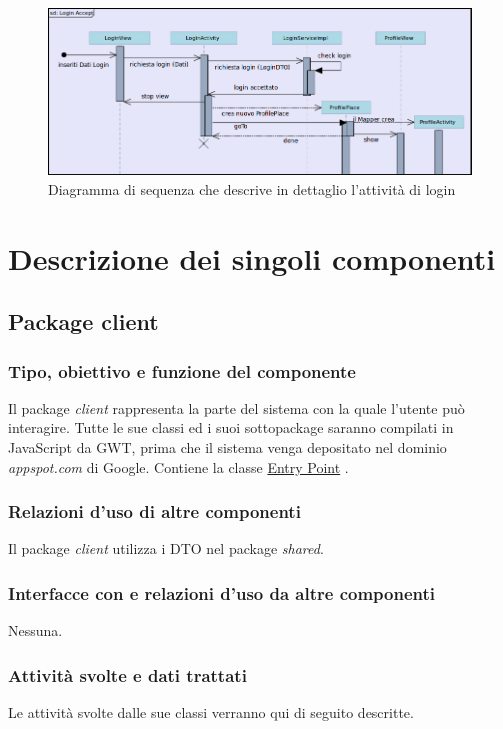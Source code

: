 \begin{figure}[h]
  \centering
  \includegraphics[width=16.5cm]{img/ST/seq-login.png}
\caption{Diagramma di sequenza che descrive in dettaglio l'attivit\`a di login}
\end{figure}


\chapter{Descrizione dei singoli componenti}
\thispagestyle{fancy}
\section{Package client}
\subsection*{Tipo, obiettivo e funzione del componente} %
Il package \emph{client} rappresenta la parte del sistema con la quale l'utente
pu\`o interagire. Tutte le sue classi ed i suoi sottopackage saranno compilati in
JavaScript da GWT, prima che il sistema venga depositato nel dominio
\emph{appspot.com} di Google. Contiene la classe \underline{Entry Point}
.

\subsection*{Relazioni d'uso di altre componenti}
Il package \emph{client} utilizza i DTO nel package \emph{shared}.

\subsection*{Interfacce con e relazioni d'uso da altre componenti}
Nessuna.

\subsection*{Attivit\`a svolte e dati trattati}
Le attivit\`a svolte dalle sue classi verranno qui di seguito descritte.

